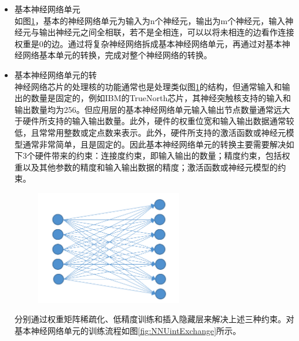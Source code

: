 \begin{itemize}
    \item 基本神经网络单元\\
    如图\ref{fig:NNUint}，基本的神经网络单元为输入为n个神经元，输出为m个神经元，输入神经元与输出神经元之间全相联，若不是全相连，可以以将未相连的边看作连接权重是0的边。通过将复杂神经网络拆成基本神经网络单元，再通过对基本神经网络基本单元的转换，完成对整个神经网络的转换。
    \item 基本神经网络单元的转\\
    神经网络芯片的处理核的功能通常也是处理类似图\ref{fig:NNUint}的结构，但通常输入和输出的数量是固定的，例如IBM的TrueNorth芯片，其神经突触核支持的输入和输出数量均为256。但应用层的基本神经网络单元输入输出节点数量通常远大于硬件所支持的输入输出数量。此外，硬件的权重位宽和输入输出数据通常较低，且常常用整数或定点数来表示。此外，硬件所支持的激活函数或神经元模型通常非常简单，且是固定的。因此基本神经网络单元的转换主要需要解决如下3个硬件带来的约束：连接度约束，即输入输出的数量；精度约束，包括权重以及其他参数的精度和输入输出数据的精度；激活函数或神经元模型的约束。
    
    \begin{figure}[!htbp]
    \centering
    \includegraphics[width=0.60\textwidth]{Img/Chap_Application/Zhang/NNUint.png}
    \label{fig:NNUint}
    \end{figure}
    
    分别通过权重矩阵稀疏化、低精度训练和插入隐藏层来解决上述三种约束。对基本神经网络单元的训练流程如图\ref{fig:NNUintExchange}所示。


\end{itemize}
